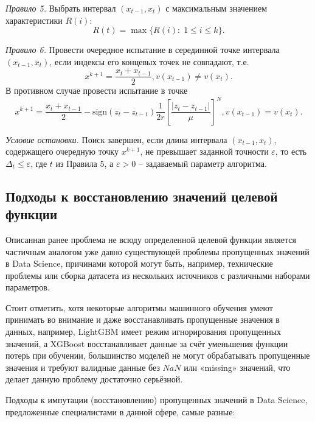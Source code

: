 \documentclass[10pt,a4paper]{book}
\begin{document}
\textit{Правило 5.} Выбрать интервал $(x_{t-1},x_t)$ с максимальным значением характеристики $R(i)$:
\[
R(t)= \max\{R(i): \; 1 \leq i \leq k\}.
\]

\textit{Правило 6.} Провести очередное испытание в серединной точке интервала $(x_{t-1},x_t)$, если индексы его концевых точек не совпадают, т.е.
\begin{equation}\label{eq10} 
x^{k+1}=\frac {x_t+x_{t-1}}{2}, v(x_{t-1})\neq v(x_t).
\end{equation}
В противном случае провести испытание в точке 
\begin{equation}\label{eq11} 
x^{k+1}= \frac {x_t+x_{t-1}}{2} -  \text{sign} {(z_t-z_{t-1})} \frac{1}{2r} \left[\frac {{|z_t-z_{t-1}|}}{\mu} \right]^N, v(x_{t-1})=v(x_t).
\end{equation}

\textit{Условие остановки.} Поиск завершен, если длина интервала $(x_{t-1},x_t)$, содержащего очередную точку $x^{k+1}$, не превышает заданной точности $\varepsilon$, то есть $\Delta _t \leq \varepsilon$, где $t$ из Правила 5, а $\varepsilon>0$ -- задаваемый параметр алгоритма.

\subsection{Подходы к восстановлению значений целевой функции}
Описанная ранее проблема не всюду определенной целевой функции является частичным аналогом уже давно существующей проблемы пропущенных значений в Data Science, причинами которой могут быть, например, технические проблемы или сборка датасета из нескольких источников с различными наборами параметров.

Стоит отметить, хотя некоторые алгоритмы машинного обучения умеют принимать во внимание и даже восстанавливать пропущенные значения в данных, например, LightGBM имеет режим игнорирования пропущенных значений, а XGBoost восстанавливает данные за счёт уменьшения функции потерь при обучении, большинство моделей не могут обрабатывать пропущенные значения и требуют валидные данные без $NaN$ или «missing» значений, что делает данную проблему достаточно серьёзной.

Подходы к импутации (восстановлению) пропущенных значений в Data Science, предложенные специалистами в данной сфере, самые разные:
\end{document}
